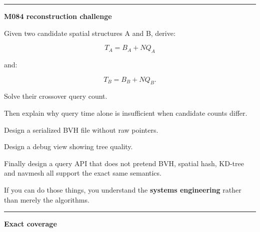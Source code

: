 \begin{center}\rule{0.5\linewidth}{0.5pt}\end{center}

\textbf{M084 reconstruction challenge}

Given two candidate spatial structures A and B, derive:

\[
T_A=B_A+NQ_A
\]

and:

\[
T_B=B_B+NQ_B.
\]

Solve their crossover query count.

Then explain why query time alone is insufficient when candidate counts differ.

Design a serialized BVH file without raw pointers.

Design a debug view showing tree quality.

Finally design a query API that does not pretend BVH, spatial hash, KD-tree and navmesh all support the exact same semantics.

If you can do those things, you understand the \textbf{systems engineering} rather than merely the algorithms.

\begin{center}\rule{0.5\linewidth}{0.5pt}\end{center}

\textbf{Exact coverage}

